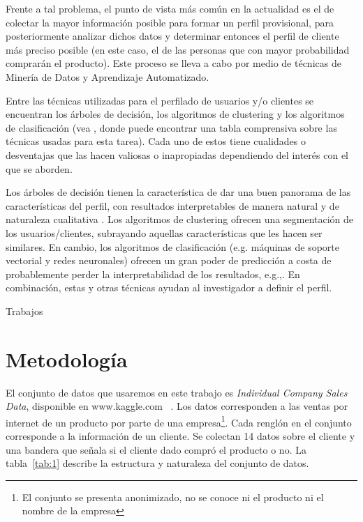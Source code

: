 \documentclass[twocolumn, letterpaper,11pt]{article}
\begin{document}
Frente a tal problema, el punto de vista más común en la actualidad es el de colectar la mayor información posible para
formar un perfil provisional, para posteriormente analizar dichos datos y determinar entonces el perfil de cliente más
preciso posible (en este caso, el de las personas que con mayor probabilidad comprarán el producto). Este proceso se
lleva a cabo por medio de técnicas de Minería de Datos y Aprendizaje Automatizado. 


Entre las técnicas utilizadas para el perfilado de usuarios y/o clientes se encuentran los árboles de decisión,
los algoritmos de clustering y los  algoritmos de clasificación (vea \cite{mah}, donde  puede encontrar una tabla
    comprensiva sobre las técnicas usadas para esta tarea). Cada uno de estos tiene cualidades o desventajas que las hacen valiosas o
inapropiadas dependiendo del interés con el que se aborden. 

Los árboles de decisión tienen la característica de dar una buen panorama de las características del perfil, con
resultados interpretables de manera natural y de naturaleza cualitativa \cite[Capítulo 6]{berry}. Los algoritmos de clustering ofrecen
una segmentación de los usuarios/clientes, subrayando aquellas características que les hacen ser similares. En cambio,
los algoritmos de clasificación (e.g. máquinas de soporte vectorial y redes neuronales) ofrecen un gran poder de
predicción a costa de probablemente perder la interpretabilidad de los resultados, e.g.,\cite{chen}. En combinación, estas y otras
técnicas ayudan al investigador a definir el perfil. 

Trabajos
\section{Metodología}

El conjunto de datos que usaremos en este trabajo es \emph{Individual Company Sales Data}, disponible en www.kaggle.com~
\cite{kaggle}. Los datos corresponden a las ventas por internet de un producto por parte de una 
empresa\footnote{El conjunto se presenta anonimizado, no se conoce ni el producto ni el nombre de la empresa}. Cada
renglón en el conjunto corresponde a la información de un cliente.  Se colectan 14 datos sobre el cliente y una bandera
que señala si el cliente dado compró el producto o no. La tabla~\ref{tab:1} describe la estructura y naturaleza del conjunto de datos.
\end{document}

